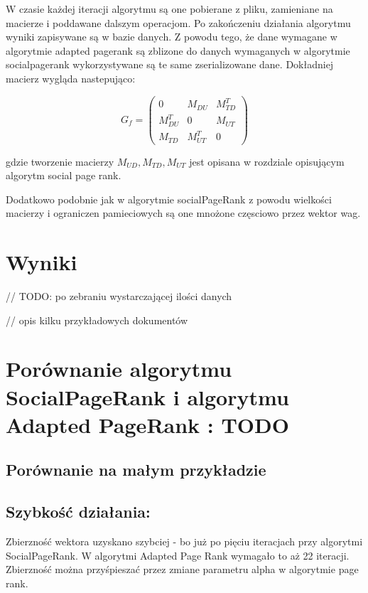 W czasie każdej iteracji algorytmu są one pobierane z pliku, zamieniane na macierze i poddawane dalszym operacjom. Po zakończeniu działania algorytmu wyniki zapisywane są w bazie danych.
Z powodu  tego, że dane wymagane w algorytmie adapted pagerank są zblizone do danych wymaganych w algorytmie socialpagerank wykorzystywane są te same zserializowane dane. Dokładniej macierz wygląda nastepująco:

\[
 G_f =
 \begin{pmatrix}
  0                     & M_{DU}       & M_{TD}^T \\
  M_{DU}^T  & 0                     & M_{UT}     \\
  M_{TD}       & M_{UT}^T   & 0 
 \end{pmatrix}
\]

gdzie tworzenie macierzy $M_{UD} , M_{TD}, M_{UT}$ jest opisana w rozdziale opisującym algorytm social page rank.

Dodatkowo podobnie jak w algorytmie socialPageRank z powodu wielkości macierzy i ograniczen pamieciowych są one mnożone częsciowo przez wektor wag. 

\section{Wyniki}
// TODO: po zebraniu wystarczającej ilości danych

// opis kilku przykładowych dokumentów

\section{Porównanie algorytmu SocialPageRank i algorytmu Adapted PageRank : TODO }

\subsection{Porównanie na małym przykładzie }

\subsection*{Szybkość działania:}
Zbierzność wektora uzyskano szybciej - bo już po pięciu iteracjach przy algorytmi SocialPageRank. W algorytmi Adapted Page Rank wymagało to aż 22 iteracji. Zbierzność można przyśpieszać przez zmiane parametru alpha w algorytmie page rank.

